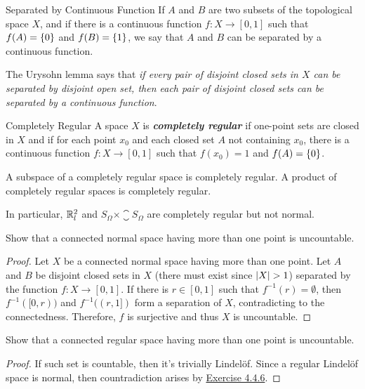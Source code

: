 \documentclass[12pt,a4paper]{article}
\begin{document}
    \begin{defi}{Separated by Continuous Function}
        If $A$ and $B$ are two subsets of the topological space $X$, and if there is a continuous function $f:X\to [0,1]$ such that $f(A)=\left\{0\right\}$ and $f(B)=\left\{1\right\}$, we say that $A$ and $B$ can be separated by a continuous function.
    \end{defi}
    \begin{remark}
        The Urysohn lemma says that \textit{if every pair of disjoint closed sets in $X$ can be separated by disjoint open set, then each pair of disjoint closed sets can be separated by a continuous function}.
    \end{remark}
    \hfill

    \begin{defi}{Completely Regular}
        A space $X$ is \textbf{\textit{completely regular}} if one-point sets are closed in $X$ and if for each point $x_0$ and each closed set $A$ not containing $x_0$, there is a continuous function $f:X\to [0,1]$ such that $f(x_0)=1$ and $f(A)=\left\{0\right\}$.
    \end{defi}
    \hfill

    \begin{thm}
        A subspace of a completely regular space is completely regular. A product of completely regular spaces is completely regular.
    \end{thm}
    \begin{cor}
        In particular, $\mathbb{R}^2_l$ and $S_\Omega\times\closure{S}_\Omega$ are completely regular but not normal.
    \end{cor}
    \hfill

    \begin{ex}\label{4.4.6}
        Show that a connected normal space having more than one point is uncountable.
    \end{ex}
    \begin{proof}
        Let $X$ be a connected normal space having more than one point. Let $A$ and $B$ be disjoint closed sets in $X$ (there must exist since $\left\lvert X\right\rvert>1$) separated by the function $f:X\to[0,1]$. If there is $r\in[0,1]$ such that $f^{-1}(r)=\emptyset$, then $f^{-1}([0,r))$ and $f^{-1}((r,1])$ form a separation of $X$, contradicting to the connectedness. Therefore, $f$ is surjective and thus $X$ is uncountable.
    \end{proof}

    \begin{ex}
        Show that a connected regular space having more than one point is uncountable.
    \end{ex}
    \begin{proof}
        If such set is countable, then it's trivially Lindel\"of. Since a regular Lindel\"of space is normal, then countradiction arises by \hyperref[4.4.6]{Exercise 4.4.6}.
    \end{proof}
    \hfill
\end{document}
